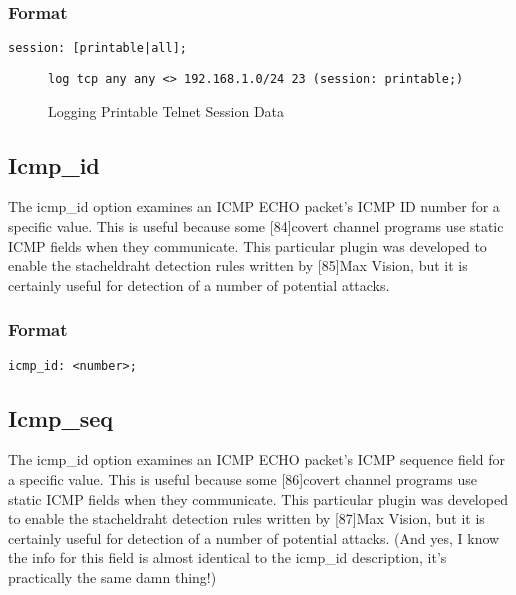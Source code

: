 \documentclass[english]{report}
\begin{document}
\subsubsection{Format}

\begin{verbatim}
session: [printable|all];
\end{verbatim}
%
\begin{figure}[!hbpt]
\begin{verbatim}
log tcp any any <> 192.168.1.0/24 23 (session: printable;)
\end{verbatim}

\caption{\label{session example}Logging Printable Telnet Session Data}
\end{figure}



\subsection{Icmp\_id}

The icmp\_id option examines an ICMP ECHO packet's ICMP ID number
for a specific value. This is useful because some {[}84{]}covert channel
programs use static ICMP fields when they communicate. This particular
plugin was developed to enable the stacheldraht detection rules written
by {[}85{]}Max Vision, but it is certainly useful for detection of
a number of potential attacks.


\subsubsection{Format}

\begin{verbatim}
icmp_id: <number>;
\end{verbatim}

\subsection{Icmp\_seq}

The icmp\_id option examines an ICMP ECHO packet's ICMP sequence field
for a specific value. This is useful because some {[}86{]}covert channel
programs use static ICMP fields when they communicate. This particular
plugin was developed to enable the stacheldraht detection rules written
by {[}87{]}Max Vision, but it is certainly useful for detection of
a number of potential attacks. (And yes, I know the info for this
field is almost identical to the icmp\_id description, it's practically
the same damn thing!)
\end{document}
